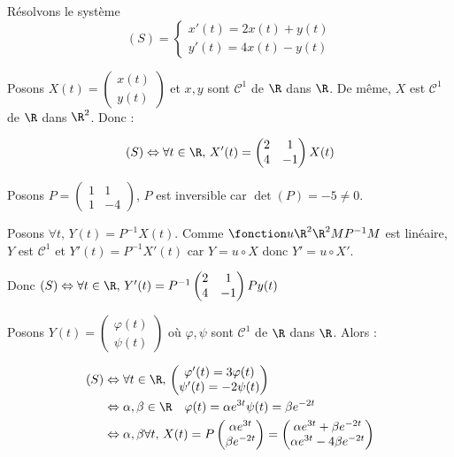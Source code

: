 \begin{exemple}
    Résolvons le système 
    \[(S) = \begin{cases}
        x'(t) = 2x(t) + y(t) \\
        y'(t) = 4x(t) - y(t)
    \end{cases}\]

    Posons $X(t) = \begin{pmatrix} x(t) \\ y(t) \end{pmatrix}$ et $x, y$ sont $\mathscr C^1$ 
    de $\R$ dans $\R$. De même, $X$ est $\mathscr C^1$ de $\R$ dans $\R^2$. Donc : 

    $$(S) \Leftrightarrow \forall t \in \R, \, X'(t) = \begin{pmatrix} 2 & 1 \\ 4 & -1 \end{pmatrix} X(t)$$

    Posons $P = \begin{pmatrix} 1 & 1 \\ 1 & -4 \end{pmatrix}$, $P$ est inversible car $\det(P) = -5 \neq 0$.

    Posons $\forall t, \, Y(t) = P^{-1}X(t)$. Comme $\fonction u {\R^2}{\R^2}{M}{P^{-1}M}$ est linéaire, 
    $Y$ est $\mathscr C^1$ et $Y'(t) = P^{-1}X'(t)$ car $Y = u \circ X$ donc $Y' = u \circ X'$.

    Donc $(S) \Leftrightarrow \forall t \in \R, \, Y'(t) = P^{-1} \begin{pmatrix} 2 & 1 \\ 4 & -1 \end{pmatrix} P y(t)$

    Posons $Y(t) = \begin{pmatrix} \varphi(t) \\ \psi(t) \end{pmatrix}$ où 
    $\varphi, \psi$ sont $\mathscr C^1$ de $\R$ dans $\R$. Alors : 

    \begin{align*}
        (S) & \Leftrightarrow \forall t \in \R, \, \begin{pmatrix} \varphi'(t)  = 3\varphi(t) \\ \psi'(t) = -2\psi(t) \end{pmatrix}\\
    & \Leftrightarrow \alpha, \beta \in \R \quad \varphi(t) = \alpha e^{3t} \space \psi(t) = \beta e^{-2t}\\
    & \Leftrightarrow \alpha, \beta \forall t, \, X(t) = P \begin{pmatrix} \alpha e^{3t} \\ \beta e^{-2t} \end{pmatrix} = \begin{pmatrix} \alpha e^{3t} + \beta e^{-2t} \\ \alpha e^{3t} - 4\beta e^{-2t} \end{pmatrix}
    \end{align*}
    
\end{exemple}

